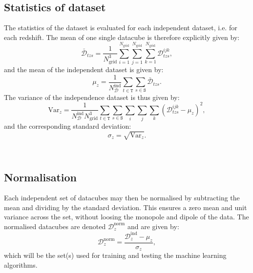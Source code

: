     \subsection{Statistics of dataset}
        The statistics of the dataset is evaluated for each independent dataset, i.e. for each redshift.
        The mean of one single datacube is therefore explicitly given by:
        \begin{equation}
            \bar{\mathcal{D}}_{tzs} = \frac{1}{N_\mathrm{grid}^3}\sum_{i=1}^{N_\mathrm{grid}}\sum_{j=1}^{N_\mathrm{grid}}\sum_{k=1}^{N_\mathrm{grid}}\mathcal{D}_{tzs}^{ijk},
        \end{equation}
        and the mean of the independent dataset is given by:
        \begin{equation}
            \mu_z = \frac{1}{N_\mathcal{D}^\mathrm{ind}}\sum_{t\in\mathtt{T}}\sum_{s\in\mathtt{S}}\bar{\mathcal{D}}_{tzs}.
        \end{equation}
        The variance of the independence dataset is thus given by:
        \begin{equation}
            \mathrm{Var}_z = \frac{1}{N_\mathcal{D}^\mathrm{ind}N_\mathrm{grid}^3}\sum_{t\in\mathtt{T}}\sum_{s\in\mathtt{S}}\sum_i\sum_j\sum_k\left(\mathcal{D}_{tzs}^{ijk} - \mu_z\right)^2,
        \end{equation}
        and the corresponding standard deviation: 
        \begin{equation}
            \sigma_z = \sqrt{\mathrm{Var}_z}.
        \end{equation}


        \\

    \subsection{Normalisation}
        Each independent set of datacubes may then be normalised by subtracting the mean and dividing by the standard deviation. This ensures a zero mean and unit variance across the set, without loosing the monopole and dipole of the data. The normalised datacubes are denoted $\mathcal{D}_z^\mathrm{norm}$ and are given by:
        \begin{equation}
            \mathcal{D}_z^\mathrm{norm} = \frac{\mathcal{D}_z^\mathrm{ind} - \mu_z}{\sigma_z},
        \end{equation}
        which will be the set(s) used for training and testing the machine learning algorithms.


